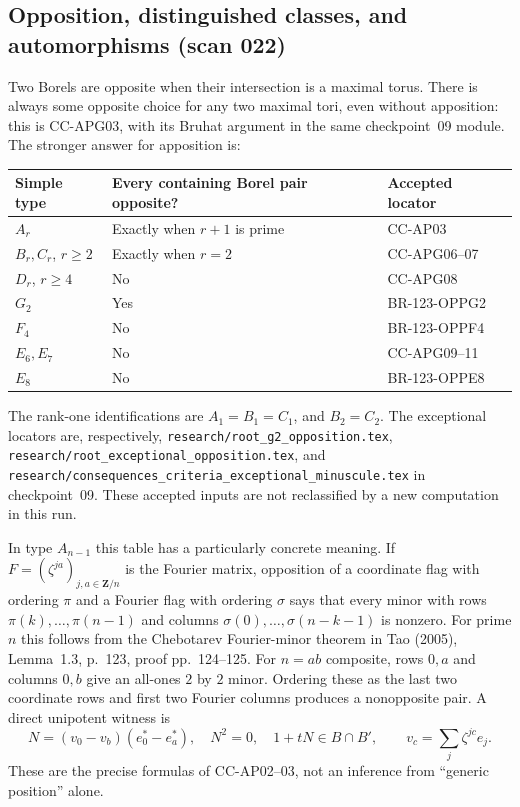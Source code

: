 \subsection{Opposition, distinguished classes, and automorphisms (scan 022)}
Two Borels are opposite when their intersection is a maximal torus.
There is always some opposite choice for any two maximal tori, even
without apposition: this is CC-APG03, with its Bruhat argument in the
same checkpoint~09 module.  The stronger answer for apposition is:
\begin{center}
\begin{tabular}{lll}
\hline
Simple type & Every containing Borel pair opposite? & Accepted locator\\
\hline
$A_r$ & Exactly when $r+1$ is prime & CC-AP03\\
$B_r,C_r$, $r\geq2$ & Exactly when $r=2$ & CC-APG06--07\\
$D_r$, $r\geq4$ & No & CC-APG08\\
$G_2$ & Yes & BR-123-OPPG2\\
$F_4$ & No & BR-123-OPPF4\\
$E_6,E_7$ & No & CC-APG09--11\\
$E_8$ & No & BR-123-OPPE8\\
\hline
\end{tabular}
\end{center}
The rank-one identifications are $A_1=B_1=C_1$, and $B_2=C_2$.
The exceptional locators are, respectively,
\nolinkurl{research/root_g2_opposition.tex},
\nolinkurl{research/root_exceptional_opposition.tex}, and
\nolinkurl{research/consequences_criteria_exceptional_minuscule.tex}
in checkpoint~09.  These accepted inputs are not reclassified by a
new computation in this run.

In type $A_{n-1}$ this table has a particularly concrete meaning.
If $F=(\zeta^{ja})_{j,a\in\mathbf Z/n}$ is the Fourier matrix,
opposition of a coordinate flag with ordering $\pi$ and a Fourier
flag with ordering $\sigma$ says that every minor with rows
$\pi(k),\ldots,\pi(n-1)$ and columns
$\sigma(0),\ldots,\sigma(n-k-1)$ is nonzero.
For prime $n$ this follows from the Chebotarev Fourier-minor theorem
in Tao (2005), Lemma~1.3, p.~123, proof pp.~124--125.
For $n=ab$ composite, rows $0,a$ and columns $0,b$ give an all-ones
$2$ by $2$ minor.  Ordering these as the last two coordinate rows and
first two Fourier columns produces a nonopposite pair.  A direct
unipotent witness is
\[
 N=(v_0-v_b)(e_0^*-e_a^*),\quad N^2=0,\quad
 1+tN\in B\cap B',\qquad
 v_c=\sum_j\zeta^{jc}e_j.
\]
These are the precise formulas of CC-AP02--03, not an inference from
``generic position'' alone.

